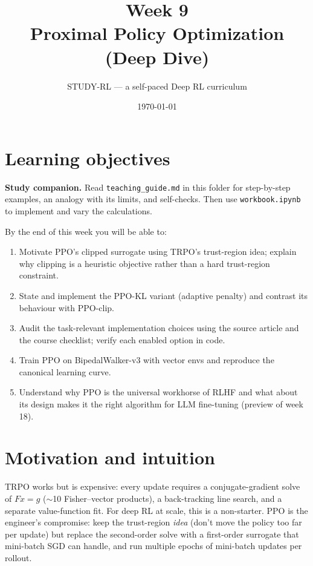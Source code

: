 \documentclass[11pt,oneside]{scrbook}
\title{{\color{rlblue}\textbf{Week 9} \\ \Huge Proximal Policy Optimization (Deep Dive)}}
\author{STUDY-RL --- a self-paced Deep RL curriculum}
\date{\today}
\begin{document}
\maketitle
\tableofcontents
\newpage

\chapter*{Learning objectives}


\noindent\textbf{Study companion.} Read \texttt{teaching\_guide.md} in this
folder for step-by-step examples, an analogy with its limits, and self-checks.
Then use \texttt{workbook.ipynb} to implement and vary the calculations.
\par\medskip

\begin{keyidea}
By the end of this week you will be able to:
\begin{enumerate}[leftmargin=*]
  \item Motivate PPO's clipped surrogate using TRPO's trust-region idea; explain why clipping is a heuristic objective rather than a hard trust-region constraint.
  \item State and implement the PPO-KL variant (adaptive penalty) and contrast its behaviour with PPO-clip.
  \item Audit the task-relevant implementation choices using the source article
and the course checklist; verify each enabled option in code.
  \item Train PPO on BipedalWalker-v3 with vector envs and reproduce the canonical learning curve.
  \item Understand why PPO is the universal workhorse of RLHF and what about its design makes it the right algorithm for LLM fine-tuning (preview of week 18).
\end{enumerate}
\end{keyidea}

\chapter{Motivation and intuition}

TRPO works but is expensive: every update requires a conjugate-gradient solve of $Fx=g$ ($\sim$10 Fisher--vector products), a back-tracking line search, and a separate value-function fit. For deep RL at scale, this is a non-starter. PPO is the engineer's compromise: keep the trust-region \emph{idea} (don't move the policy too far per update) but replace the second-order solve with a first-order surrogate that mini-batch SGD can handle, and run multiple epochs of mini-batch updates per rollout.
\end{document}
